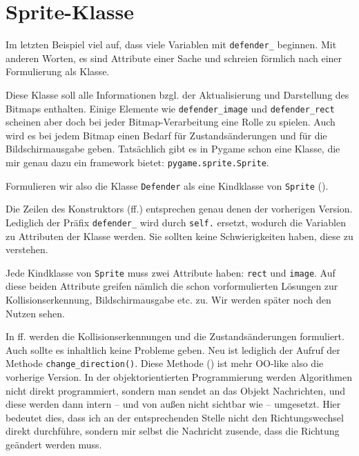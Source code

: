 \section{Sprite-Klasse}
Im letzten Beispiel viel auf, dass viele Variablen mit \texttt{defender\_} beginnen. Mit anderen Worten, es sind Attribute einer Sache und schreien förmlich nach einer Formulierung als Klasse. 

Diese Klasse soll alle Informationen bzgl. der Aktualisierung und Darstellung des Bitmaps enthalten. Einige Elemente wie \texttt{defender\_image} und \texttt{defender\_rect} scheinen aber doch bei jeder Bitmap-Verarbeitung eine Rolle zu spielen. Auch wird es bei jedem Bitmap einen Bedarf für Zustandsänderungen und für die Bildschirmausgabe geben. Tatsächlich gibt es in Pygame schon eine Klasse, die mir genau dazu ein \Gls{framework} bietet: \texttt{pygame.sprite.Sprite}. 

Formulieren wir also die Klasse \texttt{Defender} als eine Kindklasse von \texttt{Sprite} ().


Die Zeilen des Konstruktors (ff.) entsprechen genau denen der vorherigen Version. Lediglich der Präfix \texttt{defender\_} wird durch \texttt{self.} ersetzt, wodurch die Variablen zu Attributen der Klasse werden. Sie sollten keine Schwierigkeiten haben, diese zu verstehen.

Jede Kindklasse von \texttt{Sprite} muss zwei Attribute haben: \texttt{rect} und \texttt{image}. Auf diese beiden Attribute greifen nämlich die schon vorformulierten Lösungen zur Kollisionserkennung, Bildschirmausgabe etc. zu. Wir werden später noch den Nutzen sehen.

In ff. werden die Kollisionserkennungen und die Zustandsänderungen formuliert. Auch sollte es inhaltlich keine Probleme geben. Neu ist lediglich der Aufruf der Methode \texttt{change\_direction()}. Diese Methode () ist mehr OO-like also die vorherige Version. In der objektorientierten Programmierung werden Algorithmen nicht direkt programmiert, sondern man sendet an das Objekt Nachrichten, und diese werden dann intern -- und von außen nicht sichtbar wie -- umgesetzt. Hier bedeutet dies, dass ich an der entsprechenden Stelle nicht den Richtungswechsel direkt durchführe, sondern mir selbst die Nachricht zusende, dass die Richtung geändert werden muss. 


